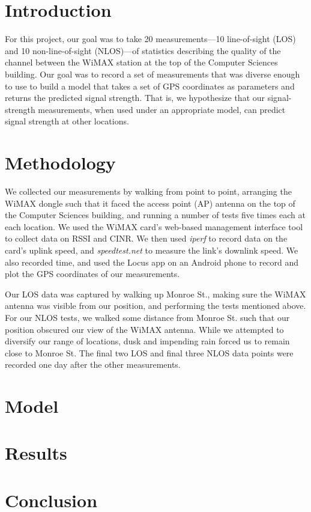 \documentclass[12pt]{article}
\begin{document}
\maketitle


\section{Introduction}
For this project, our goal was to take 20 measurements---10 line-of-sight (LOS)
and 10 non-line-of-sight (NLOS)---of statistics describing the quality of the
channel between the WiMAX station at the top of the Computer Sciences building.
Our goal was to record a set of measurements that was diverse enough to use to
build a model that takes a set of GPS coordinates as parameters and returns the
predicted signal strength. That is, we hypothesize that our signal-strength
measurements, when used under an appropriate model, can predict signal strength
at other locations.

\section{Methodology}
We collected our measurements by walking from point to point, arranging the
WiMAX dongle such that it faced the access point (AP) antenna on the top of the
Computer Sciences building, and running a number of tests five times each at
each location. We used the WiMAX card's web-based management interface tool to
collect data on RSSI and CINR. We then used \textit{iperf} to record data on the
card's uplink speed, and \textit{speedtest.net} to measure the link's downlink
speed. We also recorded time, and used the Locus app on an Android phone to
record and plot the GPS coordinates of our measurements.

Our LOS data was captured by walking up Monroe St., making sure the WiMAX
antenna was visible from our position, and performing the tests mentioned above.
For our NLOS tests, we walked some distance from Monroe St. such that our
position obscured our view of the WiMAX antenna. While we attempted to diversify
our range of locations, dusk and impending rain forced us to remain close to
Monroe St. The final two LOS and final three NLOS data points were recorded one
day after the other measurements.

\section{Model}


\section{Results}
\section{Conclusion}

%
%
\end{document}
